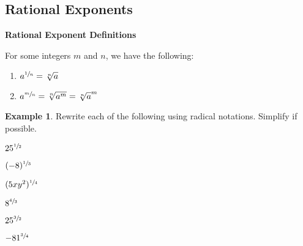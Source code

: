 \documentclass[addpoints,12pt]{exam}
\theoremstyle{definition}
\newtheorem{example}{Example}[subsection]
\begin{document}
\setcounter{section}{10}
\setcounter{subsection}{1}

\subsection{Rational Exponents}

\begin{mdframed}
\textbf{Rational Exponent Definitions}

For some integers $m$ and $n$, we have the following:
\begin{enumerate}
\item $a^{\sfrac{1}{n}} = \sqrt[n]{a}$
\item $a^{\sfrac{m}{n}} = \sqrt[n]{a^m} = \sqrt[n]{a}^m$
\end{enumerate}
\end{mdframed}

\vspace{.25in}
\begin{example}
Rewrite each of the following using radical notations. Simplify if possible.
\begin{enumerate}
\begin{minipage}{.5\textwidth}
\item $25^{\sfrac{1}{2}}$
\vspace{1.25in}
\item $(-8)^{\sfrac{1}{3}}$
\vspace{1.25in}
\item $(5xy^2)^{\sfrac{1}{4}}$
\vspace{1.25in}
\end{minipage}%
\begin{minipage}{.5\textwidth}
\item $8^{\sfrac{4}{3}}$
\vspace{1.25in}
\item $25^{\sfrac{3}{2}}$
\vspace{1.25in}
\item $-81^{\sfrac{3}{4}}$
\vspace{1.25in}
\end{minipage}%
\end{enumerate}
\end{example}


\newpage
\end{document}
